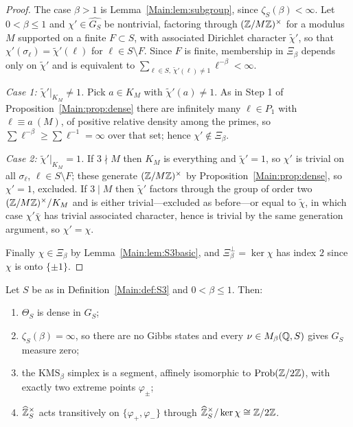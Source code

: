 \begin{proof}
The case $\beta>1$ is Lemma~\ref{Main:lem:subgroup}, since $\zeta_S(\beta)<\infty$.
Let $0<\beta\le1$ and $\chi'\in\widehat{G_S}$ be nontrivial, factoring through
$(\mathbb{Z}/M\mathbb{Z})^\times$ for a modulus $M$ supported on a finite $F\subset S$, with
associated Dirichlet character $\tilde\chi'$, so that
$\chi'(\sigma_\ell)=\tilde\chi'(\ell)$ for $\ell\in S\setminus F$. Since
$F$ is finite, membership in $\Xi_\beta$ depends only on $\tilde\chi'$ and is
equivalent to $\sum_{\ell\in S,\ \tilde\chi'(\ell)\neq1}\ell^{-\beta}<\infty$.

\emph{Case 1: $\tilde\chi'|_{K_M}\neq1$.} Pick $a\in K_M$ with
$\tilde\chi'(a)\neq1$. As in Step 1 of Proposition~\ref{Main:prop:dense} there are
infinitely many $\ell\in P_1$ with $\ell\equiv a\ (M)$, of positive relative
density among the primes, so $\sum\ell^{-\beta}\ge\sum\ell^{-1}=\infty$ over
that set; hence $\chi'\notin\Xi_\beta$.

\emph{Case 2: $\tilde\chi'|_{K_M}=1$.} If $3\nmid M$ then $K_M$ is everything
and $\tilde\chi'=1$, so $\chi'$ is trivial on all $\sigma_\ell$,
$\ell\in S\setminus F$; these generate $(\mathbb{Z}/M\mathbb{Z})^\times$ by
Proposition~\ref{Main:prop:dense}, so $\chi'=1$, excluded. If $3\mid M$ then
$\tilde\chi'$ factors through the group of order two $(\mathbb{Z}/M\mathbb{Z})^\times/K_M$ and
is either trivial---excluded as before---or equal to $\tilde\chi$, in which case
$\chi'\bar\chi$ has trivial associated character, hence is trivial by the same
generation argument, so $\chi'=\chi$.

Finally $\chi\in\Xi_\beta$ by Lemma~\ref{Main:lem:S3basic}, and $\Xi_\beta^\perp=\ker\chi$
has index $2$ since $\chi$ is onto $\{\pm1\}$.
\end{proof}

\begin{theorem}\label{Main:thm:dens}
Let $S$ be as in Definition~\ref{Main:def:S3} and $0<\beta\le1$. Then:
\begin{enumerate}
\item $\Theta_S$ is dense in $G_S$;
\item $\zeta_S(\beta)=\infty$, so there are no Gibbs states and every
$\nu\in M_\beta(\mathbb{Q},S)$ gives $G_S$ measure zero;
\item the $\mathrm{KMS}_\beta$ simplex is a segment, affinely isomorphic to
$\mathrm{Prob}(\mathbb{Z}/2\mathbb{Z})$, with exactly two extreme points $\varphi_\pm$;
\item $\widehat{\mathbb{Z}}_S^\times$ acts transitively on $\{\varphi_+,\varphi_-\}$ through
$\widehat{\mathbb{Z}}_S^\times/\ker\chi\cong\mathbb{Z}/2\mathbb{Z}$.
\end{enumerate}
\end{theorem}

